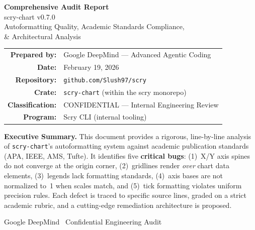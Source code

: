 \documentclass[11pt,a4paper]{article}
\begin{document}
\begin{titlepage}
\centering
\vspace*{1.5cm}

{\Huge\bfseries\color{googblue} Comprehensive Audit Report}\\[0.6cm]
{\LARGE\color{darkbg} scry-chart v0.7.0}\\[0.3cm]
{\Large\color{secgray} Autoformatting Quality, Academic Standards Compliance,}\\[0.1cm]
{\Large\color{secgray} \& Architectural Analysis}

\vspace{1.2cm}


\vspace{1.2cm}

\begin{tabular}{r l}
\textbf{Prepared by:} & Google DeepMind — Advanced Agentic Coding \\
\textbf{Date:}        & February 19, 2026 \\
\textbf{Repository:}  & \texttt{github.com/Slush97/scry} \\
\textbf{Crate:}       & \texttt{scry-chart} (within the scry monorepo) \\
\textbf{Classification:} & CONFIDENTIAL — Internal Engineering Review \\
\textbf{Program:}     & Scry CLI (internal tooling) \\
\end{tabular}

\vspace{1.2cm}

\begin{tcolorbox}[colback=lightgray,colframe=secgray,width=14cm]
\textbf{Executive Summary.}
This document provides a rigorous, line-by-line analysis of \texttt{scry-chart}'s
autoformatting system against academic publication standards (APA, IEEE, AMS,
Tufte). It identifies five \textbf{critical bugs}: (1)~X/Y axis spines do not
converge at the origin corner, (2)~gridlines render \emph{over} chart data
elements, (3)~legends lack formatting standards, (4)~axis bases are not
normalized to~1 when scales match, and (5)~tick formatting violates uniform
precision rules. Each defect is traced to specific source lines, graded on a
strict academic rubric, and a cutting-edge remediation architecture is proposed.
\end{tcolorbox}

\vfill
{\small\color{secgray} Google DeepMind \textbullet\ Confidential Engineering Audit}
\end{titlepage}
\end{document}
